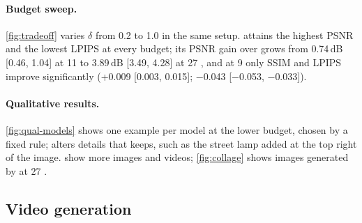 \paragraph{Budget sweep.}
\cref{fig:tradeoff} varies $\delta$ from 0.2 to 1.0 in the same setup. \ours attains the highest PSNR and the
lowest LPIPS at every budget; its PSNR gain over \seacache grows from 0.74\,dB [0.46, 1.04] at 11 \nfe
to 3.89\,dB [3.49, 4.28] at 27 \nfe, and at 9 \nfe only SSIM and LPIPS improve significantly (+0.009 [0.003, 0.015]; $-$0.043 [$-$0.053, $-$0.033]).


\begin{figure}[t]
  \centering
  
\end{figure}

\paragraph{Qualitative results.}
\cref{fig:qual-models} shows one example per model at the lower budget, chosen by a fixed rule; \seacache alters
details that \ours keeps, such as the street lamp added at the top right of the \flux image.  show more images and videos;
\cref{fig:collage} shows images generated by \ours at 27 \nfe.

\subsection{Video generation}
\label{sec:video}


